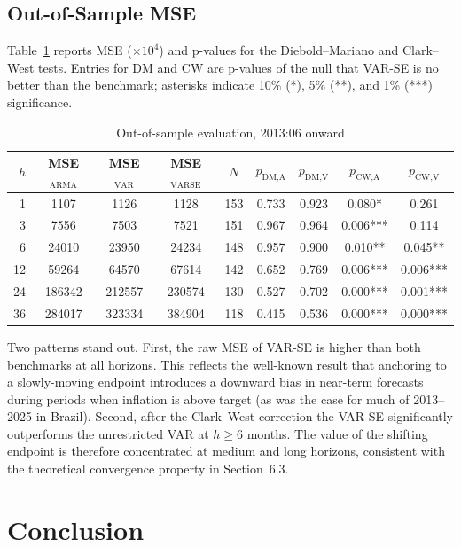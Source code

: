 \documentclass[12pt, a4paper]{article}
\begin{document}
\subsection{Out-of-Sample MSE}

Table~\ref{tab:oos} reports MSE ($\times10^4$) and p-values for the
Diebold--Mariano and Clark--West tests. Entries for DM and CW are
p-values of the null that VAR-SE is no better than the benchmark;
asterisks indicate 10\% (*), 5\% (**), and 1\% (***) significance.

\begin{table}[h!]
\centering
\caption{Out-of-sample evaluation, 2013:06 onward}
\label{tab:oos}
\begin{tabular}{rcccccccc}
\toprule
$h$ & MSE$_{\text{ARMA}}$ & MSE$_{\text{VAR}}$ & MSE$_{\text{VARSE}}$
    & $N$ & $p_{\text{DM,A}}$ & $p_{\text{DM,V}}$
    & $p_{\text{CW,A}}$ & $p_{\text{CW,V}}$ \\
\midrule
 1  & 1107  & 1126  & 1128  & 153 & 0.733 & 0.923 & 0.080*   & 0.261 \\
 3  & 7556  & 7503  & 7521  & 151 & 0.967 & 0.964 & 0.006*** & 0.114 \\
 6  & 24010 & 23950 & 24234 & 148 & 0.957 & 0.900 & 0.010**  & 0.045** \\
12  & 59264 & 64570 & 67614 & 142 & 0.652 & 0.769 & 0.006*** & 0.006*** \\
24  & 186342& 212557& 230574& 130 & 0.527 & 0.702 & 0.000*** & 0.001*** \\
36  & 284017& 323334& 384904& 118 & 0.415 & 0.536 & 0.000*** & 0.000*** \\
\bottomrule
\end{tabular}
\end{table}

Two patterns stand out. First, the raw MSE of VAR-SE is higher than both
benchmarks at all horizons. This reflects the well-known result that
anchoring to a slowly-moving endpoint introduces a downward bias in
near-term forecasts during periods when inflation is above target (as was
the case for much of 2013--2025 in Brazil). Second, after the Clark--West
correction the VAR-SE significantly outperforms the unrestricted VAR at
$h \geq 6$ months. The value of the shifting endpoint is therefore
concentrated at medium and long horizons, consistent with the theoretical
convergence property in Section~6.3.

\section{Conclusion}
\end{document}

